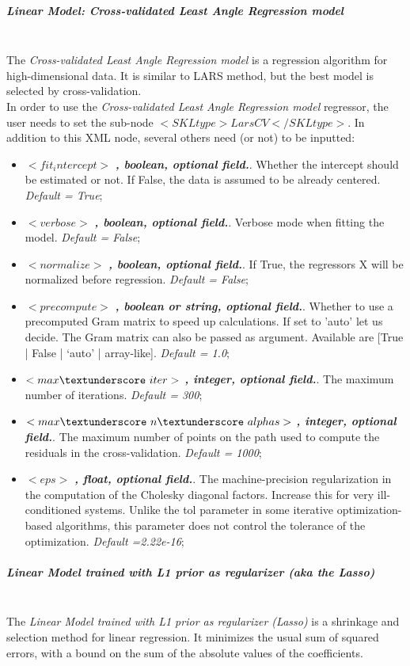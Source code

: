 \subparagraph{Linear Model: Cross-validated Least Angle Regression model}
\mbox{}
\\The \textit{Cross-validated Least Angle Regression model} is a regression algorithm for high-dimensional data. It is similar to LARS method, but the best model is selected by cross-validation.
\\In order to use the  \textit{Cross-validated Least Angle Regression model} regressor, the user needs to set the sub-node $<SKLtype>LarsCV</SKLtype>$. In addition to this XML node, several others need (or not) to be inputted:
\begin{itemize}
\item $<fit_intercept>$ \textbf{\textit{, boolean, optional field.}}.  Whether the intercept should be estimated or not. If False, the data is assumed to be already centered. \textit{Default =  True};
\item $<verbose>$ \textbf{\textit{, boolean, optional field.}}.  Verbose mode when fitting the model. \textit{Default =  False};
\item $<normalize>$ \textbf{\textit{, boolean, optional field.}}.  If True, the regressors X will be normalized before regression. \textit{Default =  False};
\item $<precompute>$ \textbf{\textit{, boolean or string, optional field.}}.  Whether to use a precomputed Gram matrix to speed up calculations. If set to 'auto' let us decide. The Gram matrix can also be passed as argument. Available are [True | False | ‘auto’ | array-like]. \textit{Default = 1.0};
\item $<max\textunderscore~iter>$ \textbf{\textit{, integer, optional field.}}.  The maximum number of iterations. \textit{Default = 300};
\item $<max\textunderscore~n\textunderscore~alphas>$ \textbf{\textit{, integer, optional field.}}. The maximum number of points on the path used to compute the residuals in the cross-validation. \textit{Default = 1000};
\item $<eps>$ \textbf{\textit{, float, optional field.}}.  The machine-precision regularization in the computation of the Cholesky diagonal factors. Increase this for very ill-conditioned systems. Unlike the tol parameter in some iterative optimization-based algorithms, this parameter does not control the tolerance of the optimization. \textit{Default =2.22e-16};
\end{itemize}
\subparagraph{Linear Model trained with L1 prior as regularizer (aka the Lasso)}
\mbox{}
\\The \textit{Linear Model trained with L1 prior as regularizer (Lasso)} is a shrinkage and selection method for linear regression. It minimizes the usual sum of squared errors, with a bound on the sum of the absolute values of the coefficients. 
